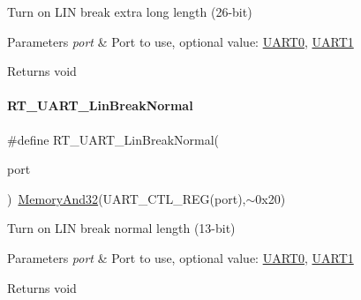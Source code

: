 Turn on L\+IN break extra long length (26-\/bit) 


\begin{DoxyParams}{Parameters}
{\em port} & Port to use, optional value\+: \mbox{\hyperlink{a00056_a0508661f121639ffdee7de2353a0def2}{U\+A\+R\+T0}}, \mbox{\hyperlink{a00056_a8d69bf04d07af4fbbab5a8bd291f65ff}{U\+A\+R\+T1}} \\
\hline
\end{DoxyParams}
\begin{DoxyReturn}{Returns}
void 
\end{DoxyReturn}
\mbox{\label{a00056_a45d1e1116c5b535f276acc73e522570f}} 
\paragraph{\texorpdfstring{R\+T\+\_\+\+U\+A\+R\+T\+\_\+\+Lin\+Break\+Normal}{RT\_UART\_LinBreakNormal}}
{\footnotesize\ttfamily \#define R\+T\+\_\+\+U\+A\+R\+T\+\_\+\+Lin\+Break\+Normal(\begin{DoxyParamCaption}\item[{}]{port }\end{DoxyParamCaption})~\mbox{\hyperlink{a00020_ad87cedffcaadc51db22594fce55173d4}{Memory\+And32}}(U\+A\+R\+T\+\_\+\+C\+T\+L\+\_\+\+R\+EG(port),$\sim$0x20)}



Turn on L\+IN break normal length (13-\/bit) 


\begin{DoxyParams}{Parameters}
{\em port} & Port to use, optional value\+: \mbox{\hyperlink{a00056_a0508661f121639ffdee7de2353a0def2}{U\+A\+R\+T0}}, \mbox{\hyperlink{a00056_a8d69bf04d07af4fbbab5a8bd291f65ff}{U\+A\+R\+T1}} \\
\hline
\end{DoxyParams}
\begin{DoxyReturn}{Returns}
void 
\end{DoxyReturn}
\mbox{\label{a00056_a2e2715198f9716282584f34a7f472649}} 
